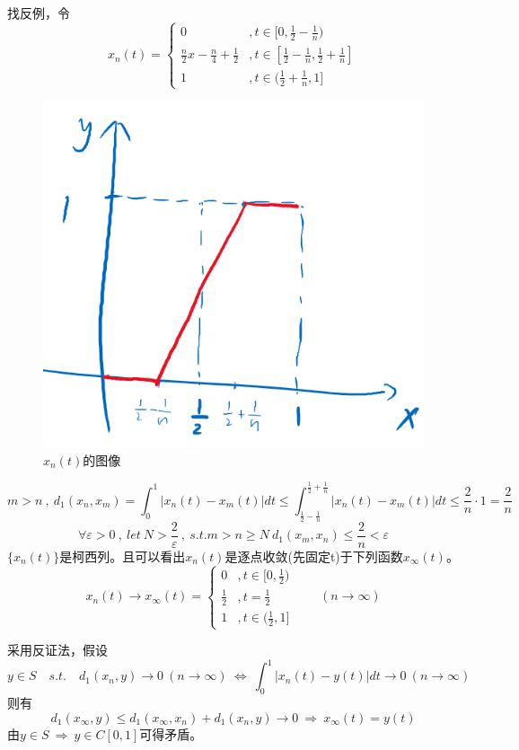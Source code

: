 找反例，令
\[x_n(t)=\left \{
\begin{array}{ll}
    0 & ,t \in [0,\frac{1}{2}-\frac{1}{n}) \\
    \frac{n}{2}x-\frac{n}{4}+\frac{1}{2} & ,t \in [\frac{1}{2}-\frac{1}{n},\frac{1}{2}+\frac{1}{n}] \\
    1 & ,t \in (\frac{1}{2}+\frac{1}{n},1]
\end{array}
\right .\]
\begin{figure}[htbp]
    \center
    \includegraphics[scale=0.4]{./fig/2.1.4_1.png}
    \caption{$x_n(t)$的图像}
\end{figure}
\[m>n \ , \ d_1(x_n,x_m)=\int_0^1|x_n(t)-x_m(t)|dt \leq \int_{\frac{1}{2}-\frac{1}{n}}^{\frac{1}{2}+\frac{1}{n}}|x_n(t)-x_m(t)|dt \leq \frac{2}{n} \cdot 1=\frac{2}{n}\]
\[\forall \varepsilon>0 \ , \ let \ N>\frac{2}{\varepsilon} \ , \ s.t. m>n \geq N \ d_1(x_m,x_n) \leq \frac{2}{n} < \varepsilon\]
$\{x_n(t)\}$是柯西列。且可以看出$x_n(t)$是逐点收敛(先固定t)于下列函数$x_{\infty}(t)$。
\[x_n(t) \rightarrow x_{\infty}(t)=\left \{
\begin{array}{ll}
    0 & ,t \in [0,\frac{1}{2}) \\
    \frac{1}{2} & ,t=\frac{1}{2} \\
    1 & ,t \in (\frac{1}{2},1]
\end{array}
\right . \qquad (n \rightarrow \infty)\]

采用反证法，假设
\[y \in S \quad s.t. \quad d_1(x_n,y) \rightarrow 0 \ (n \rightarrow \infty) \ \Leftrightarrow \ \int_0^1|x_n(t)-y(t)|dt \rightarrow 0 \ (n \rightarrow \infty)\]
则有
\[d_1(x_{\infty},y) \leq d_1(x_{\infty},x_n)+d_1(x_n,y) \rightarrow 0 \ \Rightarrow \ x_{\infty}(t)=y(t)\]
由$y \in S \ \Rightarrow \ y \in C[0,1]$可得矛盾。

